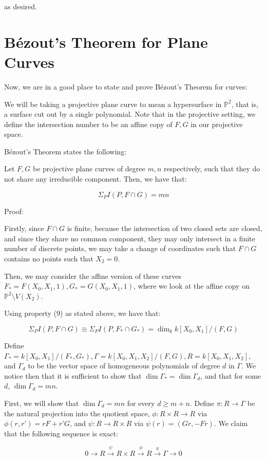 \documentclass[10pt]{article}
\begin{document}
as desired.

\section{B\'ezout’s Theorem for Plane Curves}

Now, we are in a good place to state and prove B\'ezout’s Theorem for curves:

We will be taking a projective plane curve to mean a hypersurface in $\mathbb{P}^2$, that is, a surface cut out by a single polynomial. Note that in the projective setting, we define the intersection number to be an affine copy of $F,G$ in our projective space.

B\'ezout’s Theorem states the following:

Let $F, G$ be projective plane curves of degree $m,n$ respectively, such that they do not share any irreducible component. Then, we have that:

$$\Sigma_P I(P,F \cap G) = mn $$

Proof:

Firstly, since $F \cap G$ is finite, because the intersection of two closed sets are closed, and since they share no common component, they may only intersect in a finite number of discrete points, we may take a change of coordinates such that $F \cap G$  contains no points such that $X_2 = 0$.

Then, we may consider the affine version of these curves $F_* = F(X_0,X_1, 1), G_*= G(X_0,X_1, 1)$, where we look at the affine copy on $\mathbb{P}^2 \setminus V(X_2)$. 

Using property (9) as stated above, we have that:

$$\Sigma_P I(P,F \cap G) \equiv \Sigma_P I(P,F_* \cap G_*) = \dim_k k[X_0,X_1]/(F,G) $$

Define $\Gamma_* = k[X_0,X_1]/(F_*, G_*), \Gamma = k[X_0,X_1,X_2]/(F,G), R = k[X_0,X_1,X_2]$, and $\Gamma_d$ to be the vector space of homogeneous polynomials of degree $d$ in $\Gamma$. We notice then that it is sufficient to show that $\dim \Gamma_* = \dim \Gamma_d$, and that for some $d$, $\dim \Gamma_d = mn$.

First, we will show that $\dim \Gamma_d = mn$ for every $d \geq m+ n$. Define $\pi: R \to \Gamma$ be the natural projection into the quotient space, $\phi: R \times R \to R$ via $\phi(r,r’) = rF + r’G$, and $\psi: R \to R \times R$ via $\psi(r) = (Gr, -Fr)$. We claim that the following sequence is exact:

$$ 0 \xrightarrow[]{} R \xrightarrow[]{\psi} R \times R \xrightarrow[]{\phi} R \xrightarrow[]{\pi} \Gamma \to 0 $$
\end{document}
